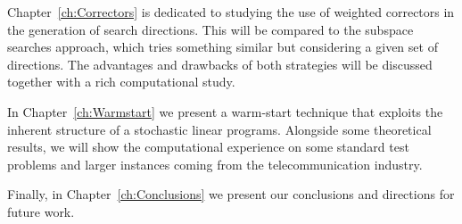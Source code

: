 Chapter~\ref{ch:Correctors} is dedicated to studying the use of
weighted correctors in the generation of search directions. This will
be compared to the subspace searches approach, which tries something
similar but considering a given set of directions. The advantages
and drawbacks of both strategies will be discussed together with
a rich computational study.

In Chapter~\ref{ch:Warmstart} we present a warm-start technique
that exploits the inherent structure of a stochastic linear programs.
Alongside some theoretical results, we will show the computational
experience on some standard test problems and larger instances coming
from the telecommunication industry.

Finally, in Chapter~\ref{ch:Conclusions} we present our conclusions
and directions for future work.
